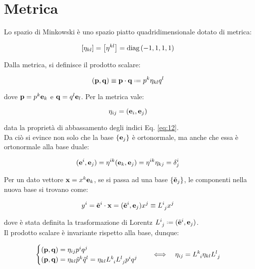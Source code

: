 
\section{Metrica}

Lo spazio di Minkowski è uno spazio piatto quadridimensionale dotato di metrica:

\begin{equation}
	\left[\eta_{kl}\right] = \left[\eta^{kl}\right] = \text{diag}\,(-1,1,1,1)
	\label{eq:2.1}
\end{equation}

Dalla metrica, si definisce il prodotto scalare:

\begin{equation}
	(\ve{p},\ve{q}) \equiv \ve{p}\cdot\ve{q} \defeq p^k \eta_{kl} q^l
	\label{eq:2.2}
\end{equation}

dove $ \mathbf{p} = p^k \mathbf{e}_k $ e $ \mathbf{q} = q^l \mathbf{e}_l $. Per la metrica vale:

\begin{equation}
	\eta_{ij} = (\mathbf{e}_i,\mathbf{e}_j)
	\label{eq:2.3}
\end{equation}

data la proprietà di abbassamento degli indici Eq. \ref{eq:12}.\\
Da ciò si evince non solo che la base $ \{\mathbf{e}_j\} $ è ortonormale, ma anche che essa è ortonormale alla base duale:

\begin{equation}
	(\mathbf{e}^i,\mathbf{e}_j) = \eta^{ik} (\mathbf{e}_k,\mathbf{e}_j) = \eta^{ik} \eta_{kj} = \delta^i_j
	\label{eq:2.4}
\end{equation}

Per un dato vettore $ \mathbf{x} = x^k \mathbf{e}_k $, se si passa ad una base $ \{\tilde{\mathbf{e}}_j\} $, le componenti nella nuova base si trovano come:

\begin{equation}
	y^i = \tilde{\mathbf{e}}^i \cdot \mathbf{x} = (\tilde{\mathbf{e}}^i,\mathbf{e}_j) x^j \equiv L^i_{\,\,j} x^j
	\label{eq:2.5}
\end{equation}

dove è stata definita la trasformazione di Lorentz $ L^i_{\,\,j} \defeq (\tilde{\ve{e}}^i,\ve{e}_j) $.\\
Il prodotto scalare è invariante rispetto alla base, dunque:

\begin{equation}
	\begin{cases}
		(\mathbf{p},\mathbf{q}) = \eta_{ij} p^i q^j  \\
		(\mathbf{p},\mathbf{q}) = \eta_{kl} \tilde{p}^k \tilde{q}^l = \eta_{kl} L^k_{\,\,\,i} L^l_{\,\,j} p^i q^j
	\end{cases}
	\quad \Longleftrightarrow \quad \eta_{ij} = L^k_{\,\,\,i} \eta_{kl} L^l_{\,\,j}
	\label{eq:2.6}
\end{equation}


